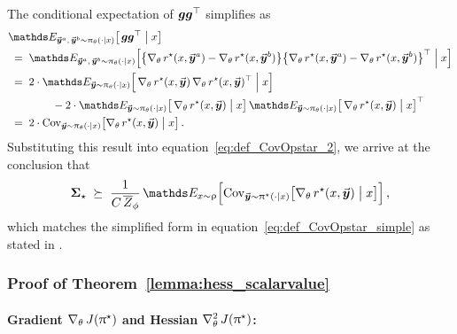 	The conditional expectation of $\boldsymbol{g} \boldsymbol{g}^\top$ simplifies as
    \begin{align*}
    	& \Exp_{\responseone, \, \responsetwo \sim \policytheta(\cdot \mid \prompt)}
    	\big[ \, \grad \grad^{\top} \bigm| \prompt\big]  \\
    	& \; = \; \Exp_{\responseone, \, \responsetwo \sim \policytheta(\cdot \mid \prompt)}
    	\Big[ \big\{ \gradtheta \rewardstar(\prompt, \responseone) - \gradtheta \rewardstar(\prompt, \responsetwo) \big\} \big\{ \gradtheta \rewardstar(\prompt, \responseone) - \gradtheta \rewardstar(\prompt, \responsetwo) \big\}^{\top} \Bigm| \prompt\Big]  \\
    	& \; = \; 2 \cdot \Exp_{\response \sim \policytheta(\cdot \mid \prompt)}
    	\Big[ \, \gradtheta \rewardstar(\prompt, \response) \, \gradtheta \rewardstar(\prompt, \response)^{\top} \Bigm| \prompt\Big] \\
        & \qquad \qquad - 2 \cdot \Exp_{\response \sim \policytheta(\cdot \mid \prompt)} \big[ \, \gradtheta \rewardstar(\prompt, \response) \bigm| \prompt\big]  \, \Exp_{\response \sim \policytheta(\cdot \mid \prompt)}
    	\big[ \,\gradtheta \rewardstar(\prompt, \response) \bigm| \prompt \big]^{\top}  \\
    	& \; = \; 2 \cdot \Cov_{\response \sim \policytheta(\cdot \mid \prompt)} \big[ \gradtheta \rewardstar(\prompt, \response) \bigm| \prompt \big] \, .
    \end{align*}
	Substituting this result into equation~\eqref{eq:def_CovOpstar_2}, we arrive at the conclusion that
	\begin{align*}
		\CovOpstar \; \succeq \; \frac{1}{\Const{} \, \Partitionphibar} \, \Exp_{\prompt \sim \promptdistr} \Big[ \Cov_{\response \sim \policystar(\cdot \mid \prompt)} \big[ \gradtheta \rewardstar(\prompt, \response) \bigm| \prompt \big] \Big] \, ,
	\end{align*}
	which matches the simplified form in equation~\eqref{eq:def_CovOpstar_simple} as stated in .

		
		
		
	
	
    \subsubsection{Proof of Theorem~\ref{lemma:hess_scalarvalue} \yaqidone}
    \label{sec:proof:lemma:hess_scalarvalue}

	\paragraph{Gradient $ \nabla_{\theta} \,  J(\uppi^{\star}) $ and Hessian $\nabla_{\theta}^2 \,  J(\uppi^{\star})$:}
	
